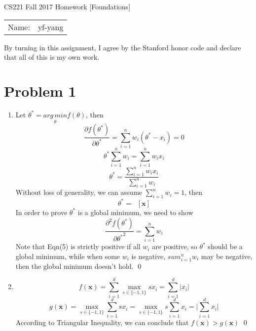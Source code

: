\documentclass[12pt]{article}
\begin{document}
\begin{center}
{\Large CS221 Fall 2017 Homework [Foundations]}

\begin{tabular}{rl}
Name: & yf-yang
\end{tabular}
\end{center}

By turning in this assignment, I agree by the Stanford honor code and declare
that all of this is my own work.

\section*{Problem 1}

\begin{enumerate}[label=(\alph*)]
  \item 
    Let $\theta^{\ast} = \underset{\theta}{arg\,min} f(\theta)$, then
    \begin{equation}\frac{\partial f(\theta^{\ast})}{\partial \theta^{\ast}} = \sum_{i=1}^{n}{w_i(\theta^{\ast} - x_i)} = 0\end{equation}
    \begin{equation}\theta^{\ast}\sum_{i=1}^{n}{w_i} = \sum_{i=1}^{n}{w_i x_i}\end{equation}
    \begin{equation}\theta^{\ast} = \frac{\sum_{i=1}^{n}{w_i x_i}}{\sum_{i=1}^{n}{w_i}}\end{equation}
    Without loss of generality, we can assume $\sum_{i=1}^{n}{w_i}=1$, then
    \begin{equation}\theta^{\ast} = \mathop{\mathbb{E}_{\mathbf{w}}}[\mathbf{x}]\end{equation}
    In order to prove $\theta^{\ast}$ is a global minimum, we need to show
    \begin{equation}\frac{\partial^2 f(\theta^{\ast})}{\partial {\theta^{\ast}}^2} = \sum_{i=1}^{n}{w_i}\end{equation}
    Note that Eqn(5) is strictly positive if all $w_i$ are positive, so $\theta^{\ast}$ should be a global minimum, while when some $w_i$ is negative, $sum_{i=1}^{n}{w_i}$ may be negative, then the global minimum doesn't hold. \qed
    
  \item 
    \begin{equation} f(\mathbf{x})=\sum_{i=1}^{d}{\max_{s\in \{-1,1\}}{s x_i}} = \sum_{i=1}^{d}{{\lvert}x_i{\rvert}} \end{equation}
    \begin{equation} g(\mathbf{x})=\max_{s\in \{-1,1\}}{\sum_{i=1}^{d}{s x_i}} = \max_{s\in \{-1,1\}}{s \sum_{i=1}^{d}{x_i}} = {\lvert}\sum_{i=1}^{d}{x_i}{\rvert} \end{equation}
    According to Triangular Inequality, we can conclude that $f(\mathbf{x}) > g(\mathbf{x})$ \qed


\end{enumerate}
\end{document}
